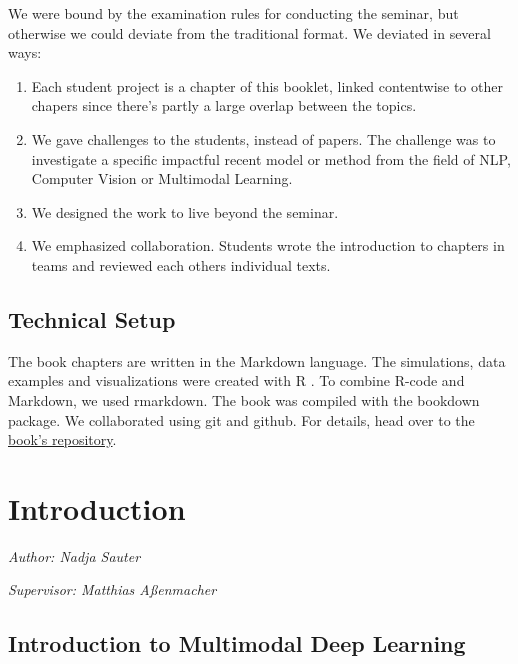 \documentclass[
]{krantz}
\providecommand{\tightlist}{%
  \setlength{\itemsep}{0pt}\setlength{\parskip}{0pt}}
\begin{document}
We were bound by the examination rules for conducting the seminar, but otherwise we could deviate from the traditional format.
We deviated in several ways:

\begin{enumerate}
\def\labelenumi{\arabic{enumi}.}
\tightlist
\item
  Each student project is a chapter of this booklet, linked contentwise to other chapers since there's partly a large overlap between the topics.
\item
  We gave challenges to the students, instead of papers. The challenge was to investigate a specific impactful recent model or method from the field of NLP, Computer Vision or Multimodal Learning.
\item
  We designed the work to live beyond the seminar.
\item
  We emphasized collaboration. Students wrote the introduction to chapters in teams and reviewed each others individual texts.
\end{enumerate}

\hypertarget{technical-setup}{%
\section*{Technical Setup}\label{technical-setup}}


The book chapters are written in the Markdown language.
The simulations, data examples and visualizations were created with R \citep{rlang}.
To combine R-code and Markdown, we used rmarkdown.
The book was compiled with the bookdown package.
We collaborated using git and github.
For details, head over to the \href{https://github.com/slds-lmu/seminar_multimodal_dl}{book's repository}.

\hypertarget{introduction}{%
\chapter{Introduction}\label{introduction}}

\emph{Author: Nadja Sauter}

\emph{Supervisor: Matthias Aßenmacher}

\hypertarget{introduction-to-multimodal-deep-learning}{%
\section{Introduction to Multimodal Deep Learning}\label{introduction-to-multimodal-deep-learning}}
\end{document}
